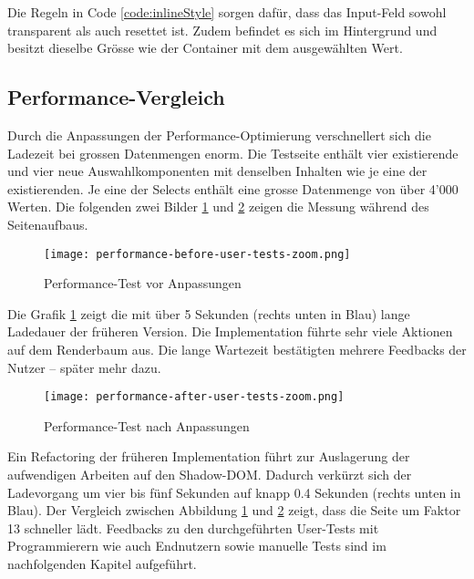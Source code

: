 Die Regeln in Code \ref{code:inlineStyle} sorgen dafür, dass das Input-Feld sowohl transparent als auch resettet ist. 
Zudem befindet es sich im Hintergrund und besitzt dieselbe Grösse wie der Container mit dem ausgewählten Wert. 


\subsection{Performance-Vergleich}
\label{sec:performanceCompare}

Durch die Anpassungen der Performance-Optimierung verschnellert sich die Ladezeit bei grossen Datenmengen enorm. 
Die Testseite enthält vier existierende und vier neue Auswahlkomponenten mit denselben Inhalten wie je eine der existierenden. 
Je eine der Selects enthält eine grosse Datenmenge von über 4'000 Werten. 
Die folgenden zwei Bilder \ref{img:performanceTestBefore} und \ref{img:performanceTestAfter} zeigen die Messung während des Seitenaufbaus. 

\begin{figure}[!htb]
    \centering
    \texttt{[image: performance-before-user-tests-zoom.png]}
    \caption{\centering Performance-Test vor Anpassungen}
    \label{img:performanceTestBefore}
\end{figure}

Die Grafik \ref{img:performanceTestBefore} zeigt die mit über 5 Sekunden (rechts unten in Blau) lange Ladedauer der früheren Version. 
Die Implementation führte sehr viele Aktionen auf dem Renderbaum aus. 
Die lange Wartezeit bestätigten mehrere Feedbacks der Nutzer – später mehr dazu. 

\begin{figure}[!htb]
    \centering
    \texttt{[image: performance-after-user-tests-zoom.png]}
    \caption{\centering Performance-Test nach Anpassungen}
    \label{img:performanceTestAfter}
\end{figure}

Ein Refactoring der früheren Implementation führt zur Auslagerung der aufwendigen Arbeiten auf den Shadow-DOM. 
Dadurch verkürzt sich der Ladevorgang um vier bis fünf Sekunden auf knapp 0.4 Sekunden (rechts unten in Blau). 
Der Vergleich zwischen Abbildung \ref{img:performanceTestBefore} und \ref{img:performanceTestAfter} zeigt, dass die Seite um Faktor 13 schneller lädt. 
Feedbacks zu den durchgeführten User-Tests mit Programmierern wie auch Endnutzern sowie manuelle Tests sind im nachfolgenden Kapitel aufgeführt. 


